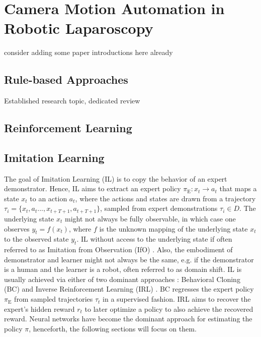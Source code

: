 

\section{Camera Motion Automation in Robotic Laparoscopy}
\label{in:sec:camera_motion_automation}
consider adding some paper introductions here already

\subsection{Rule-based Approaches}
Established research topic, dedicated review

\subsection{Reinforcement Learning}

\subsection{Imitation Learning}
The goal of Imitation Learning (IL) is to copy the behavior of an expert demonstrator. Hence, IL aims to extract an expert policy $\pi_\text{E}: x_t \rightarrow a_t$ that maps a state $x_t$ to an action $a_t$, where the actions and states are drawn from a trajectory $\tau_i = \{x_t,a_t...,x_{t+T+1},a_{t+T+1}\}$, sampled from expert demonstrations $\tau_i \in D$. The underlying state $x_t$ might not always be fully observable, in which case one observes $y_t = f(x_t)$, where $f$ is the unknown mapping of the underlying state $x_t$ to the observed state $y_t$. IL without access to the underlying state if often referred to as Imitation from Observation (IfO) \cite{liu2018imitation}. Also, the embodiment of demonstrator and learner might not always be the same, e.g. if the demonstrator is a human and the learner is a robot, often referred to as domain shift. IL is usually achieved via either of two dominant approaches \cite{osa2018algorithmic}: Behavioral Cloning (BC) \cite{pomerleau1991efficient} and Inverse Reinforcement Learning (IRL) \cite{ng2000algorithms}. BC regresses the expert policy $\pi_\text{E}$ from sampled trajectories $\tau_t$ in a supervised fashion. IRL aims to recover the expert's hidden reward $r_t$ to later optimize a policy to also achieve the recovered reward. Neural networks have become the dominant approach for estimating the policy $\pi$, henceforth, the following sections will focus on them.

